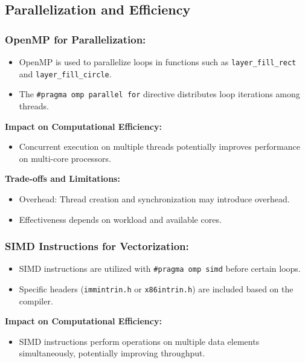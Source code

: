 \documentclass{article}
\begin{document}
\subsection{Parallelization and Efficiency}
\subsubsection*{OpenMP for Parallelization:}
\begin{itemize}
  \item OpenMP is used to parallelize loops in functions such as \texttt{layer\_fill\_rect} and \texttt{layer\_fill\_circle}.
  \item The \texttt{\#pragma omp parallel for} directive distributes loop iterations among threads.
\end{itemize}

\textbf{Impact on Computational Efficiency:}
\begin{itemize}
  \item Concurrent execution on multiple threads potentially improves performance on multi-core processors.
\end{itemize}

\textbf{Trade-offs and Limitations:}
\begin{itemize}
  \item Overhead: Thread creation and synchronization may introduce overhead.
  \item Effectiveness depends on workload and available cores.
\end{itemize}

\subsubsection*{SIMD Instructions for Vectorization:}
\begin{itemize}
  \item SIMD instructions are utilized with \texttt{\#pragma omp simd} before certain loops.
  \item Specific headers (\texttt{immintrin.h} or \texttt{x86intrin.h}) are included based on the compiler.
\end{itemize}

\textbf{Impact on Computational Efficiency:}
\begin{itemize}
  \item SIMD instructions perform operations on multiple data elements simultaneously, potentially improving throughput.
\end{itemize}
\end{document}
